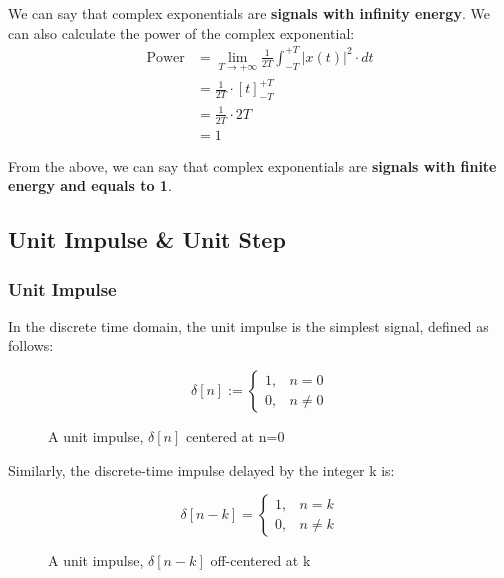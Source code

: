\documentclass[letterpaper,12pt]{article}
\begin{document}
We can say that complex exponentials are \textbf{signals with infinity energy}. We can also calculate the power of the complex exponential:
\begin{equation*}
    \begin{aligned}
        \text{Power} & = \lim_{T \to +\infty} \frac{1}{2T}\int_{-T}^{+T}\left|x\left(t\right)\right|^{2}\cdot dt \\
                     & = \frac{1}{2T}\cdot[t]^{+T}_{-T}                                                          \\
                     & = \frac{1}{2T}\cdot2T                                                                     \\
                     & = 1
    \end{aligned}
\end{equation*}

From the above, we can say that complex exponentials are \textbf{signals with finite energy and equals to 1}.

\newpage
\subsection*{Unit Impulse \& Unit Step}
\subsubsection*{Unit Impulse}
In the discrete time domain, the unit impulse is the simplest signal, defined as follows:

\[\delta[n] :=
    \begin{cases}
        1, & n = 0    \\
        0, & n \neq 0
    \end{cases}
\]

\begin{figure}[!ht]
    \centering
    
    \caption{A unit impulse, $\delta[n]$ centered at n=0}\label{fig:unit_impulse}
\end{figure}

Similarly, the discrete-time impulse delayed by the integer k is:

\[\delta[n - k] =
    \begin{cases}
        1, & n = k    \\
        0, & n \neq k
    \end{cases}
\]

\begin{figure}[!ht]
    \centering
    
    \caption{A unit impulse, $\delta[n-k]$ off-centered at k}
    \label{fig:unit_impulse_off_center}
\end{figure}
\end{document}
